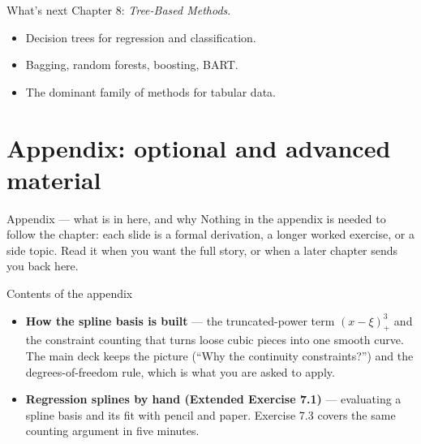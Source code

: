 \documentclass[aspectratio=169,11pt]{beamer}
\begin{document}
\begin{frame}{What's next}
  Chapter 8: \emph{Tree-Based Methods}.
  \begin{itemize}
    \item Decision trees for regression and classification.
    \item Bagging, random forests, boosting, BART.
    \item The dominant family of methods for tabular data.
  \end{itemize}
\end{frame}


\appendix
\AtBeginSection[]{}
\section{Appendix: optional and advanced material}

\begin{frame}{Appendix --- what is in here, and why}
  \small
  Nothing in the appendix is needed to follow the chapter: each slide is a
  formal derivation, a longer worked exercise, or a side topic. Read it when
  you want the full story, or when a later chapter sends you back here.
  \begin{block}{Contents of the appendix}
    \begin{itemize}
      \item \textbf{How the spline basis is built} --- the truncated-power term $(x-\xi)_+^3$ and the constraint counting that turns loose cubic pieces into one smooth curve. The main deck keeps the picture (``Why the continuity constraints?'') and the degrees-of-freedom rule, which is what you are asked to apply.
      \item \textbf{Regression splines by hand (Extended Exercise 7.1)} --- evaluating a spline basis and its fit with pencil and paper. Exercise 7.3 covers the same counting argument in five minutes.
    \end{itemize}
  \end{block}
\end{frame}
\end{document}
